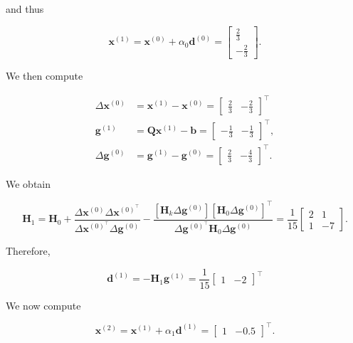 and thus

\[
	\boldsymbol{x}^{(1)}=\boldsymbol{x}^{(0)}+\alpha_{0} \boldsymbol{d}^{(0)}=\left[\begin{array}{c}
		\frac{2}{3} \\
		-\frac{2}{3}
	\end{array}\right] .
\]

We then compute

\[
	\begin{aligned}
		\Delta \boldsymbol{x}^{(0)} & =\boldsymbol{x}^{(1)}-\boldsymbol{x}^{(0)}=\left[\begin{array}{ll}
			\frac{2}{3} & -\frac{2}{3}
		\end{array}\right]^{\top} \\
		\boldsymbol{g}^{(1)} & =\boldsymbol{Q} \boldsymbol{x}^{(1)}-\boldsymbol{b}=\left[\begin{array}{ll}
			-\frac{1}{3} & -\frac{1}{3}
		\end{array}\right]^{\top}, \\
		\Delta \boldsymbol{g}^{(0)} & =\boldsymbol{g}^{(1)}-\boldsymbol{g}^{(0)}=\left[\begin{array}{ll}
			\frac{2}{3} & -\frac{4}{3}
		\end{array}\right]^{\top} .
	\end{aligned}
\]

We obtain

\[
	\boldsymbol{H}_{1}=\boldsymbol{H}_{0}+\frac{\Delta \boldsymbol{x}^{(0)} \Delta \boldsymbol{x}^{(0)^{\top}}}{\Delta \boldsymbol{x}^{(0)^{\top}} \Delta \boldsymbol{g}^{(0)}}-\frac{\left[\boldsymbol{H}_{k} \Delta \boldsymbol{g}^{(0)}\right]\left[\boldsymbol{H}_{0} \Delta \boldsymbol{g}^{(0)}\right]^{\top}}{\Delta \boldsymbol{g}^{(0)^{\top}} \boldsymbol{H}_{0} \Delta \boldsymbol{g}^{(0)}}=\frac{1}{15}\left[\begin{array}{cc}
		2 & 1 \\
		1 & -7
	\end{array}\right] .
\]

Therefore,

\[
	\boldsymbol{d}^{(1)}=-\boldsymbol{H}_{1} \boldsymbol{g}^{(1)}=\frac{1}{15}\left[\begin{array}{ll}
		1 & -2
	\end{array}\right]^{\top}
\]

We now compute

\[
	\boldsymbol{x}^{(2)}=\boldsymbol{x}^{(1)}+\alpha_{1} \boldsymbol{d}^{(1)}=\left[\begin{array}{ll}
		1 & -0.5
	\end{array}\right]^{\top} .
\]

